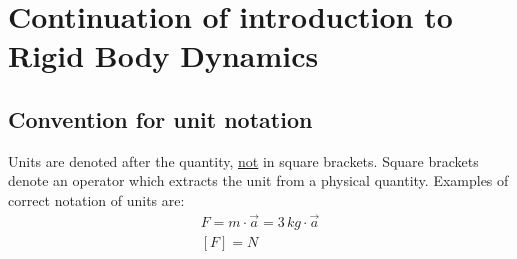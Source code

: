 \documentclass[11pt, a4paper]{article}
\begin{document}
\setcounter{section}{1}
\section{Continuation of introduction to Rigid Body Dynamics}


\subsection{Convention for unit notation}
Units are denoted after the quantity, \underline{not} in square brackets. Square brackets denote an operator which extracts the unit from a physical quantity. Examples of correct notation of units are:
\begin{gather*}
  F = m\cdot \vec{a} = 3\,kg \cdot \vec{a}\\
  [F] = N
\end{gather*}
\end{document}
